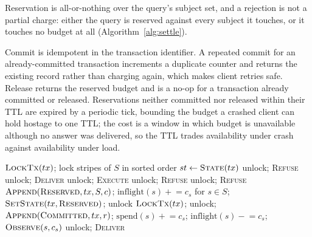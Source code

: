 Reservation is all-or-nothing over the query's subject set, and a rejection is
not a partial charge: either the query is reserved against every subject it
touches, or it touches no budget at all (Algorithm~\ref{alg:settle}).

Commit is idempotent in the transaction identifier. A repeated commit for an
already-committed transaction increments a duplicate counter and returns the
existing record rather than charging again, which makes client retries safe.
Release returns the reserved budget and is a no-op for a transaction already
committed or released. Reservations neither committed nor released within their
TTL are expired by a periodic tick, bounding the budget a crashed client can hold
hostage to one TTL; the cost is a window in which budget is unavailable although
no answer was delivered, so the TTL trades availability under crash against
availability under load.

\begin{algorithm}[tb]
\caption{Settlement. The log append is the commit point: durable before the state
changes and before any answer leaves. The identifier index and the stripes are taken
before the state is read, so one identifier means one payload even when two supports
are disjoint. States: \textsc{Reserved}$\to$\textsc{Committed} (deliver the stored
answer), \textsc{Reserved}$\to$\textsc{Released} (abort or TTL); both are terminal, a
repeated commit is a no-op, and a retry with the same identifier but a different
payload is refused. $H(\cdot)$ covers tenant, platform, query digest, support, charge,
mechanism and policy version.}
\label{alg:settle}
\footnotesize
\begin{algorithmic}[1]
  \State $\Call{LockTx}{tx}$; lock stripes of $S$ in sorted order 
  \State $st \gets \Call{State}{tx}$
   
      \State unlock; \Return \textsc{Refuse}
    \EndIf
     \State unlock; \Return \textsc{Deliver} \EndIf
     \State unlock; \Return \textsc{Execute} \EndIf
    \State unlock; \Return \textsc{Refuse} 
  \EndIf
    \State unlock; \Return \textsc{Refuse}
  \EndIf
  \State $\Call{Append}{\textsc{Reserved}, tx, S, c}$; 
  \State $\mathrm{inflight}(s)\mathrel{+}=c_s$ for $s\in S$; $\Call{SetState}{tx,\textsc{Reserved}}$; unlock
\EndProcedure
{}
  \State $\Call{LockTx}{tx}$;  unlock; \Return \EndIf
  \State $\Call{Append}{\textsc{Committed}, tx, r}$;  
  \State $\mathrm{spend}(s)\mathrel{+}=c_s$; $\mathrm{inflight}(s)\mathrel{-}=c_s$; $\Call{Observe}{s,c_s}$
  \State unlock; \Return \textsc{Deliver}
\EndProcedure
\end{algorithmic}
\end{algorithm}

